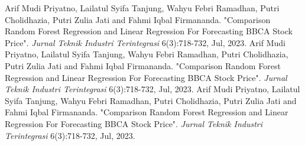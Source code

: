 \begin{thebibliography}{00}
% 
 Arif Mudi Priyatno, Lailatul Syifa Tanjung, Wahyu Febri Ramadhan, Putri Cholidhazia, Putri Zulia Jati and Fahmi Iqbal Firmananda. "Comparison Random Forest Regression and Linear Regression For Forecasting BBCA Stock Price". \textit{Jurnal Teknik Industri Terintegrasi} 6(3):718-732, Jul, 2023.
 Arif Mudi Priyatno, Lailatul Syifa Tanjung, Wahyu Febri Ramadhan, Putri Cholidhazia, Putri Zulia Jati and Fahmi Iqbal Firmananda. "Comparison Random Forest Regression and Linear Regression For Forecasting BBCA Stock Price". \textit{Jurnal Teknik Industri Terintegrasi} 6(3):718-732, Jul, 2023.
 Arif Mudi Priyatno, Lailatul Syifa Tanjung, Wahyu Febri Ramadhan, Putri Cholidhazia, Putri Zulia Jati and Fahmi Iqbal Firmananda. "Comparison Random Forest Regression and Linear Regression For Forecasting BBCA Stock Price". \textit{Jurnal Teknik Industri Terintegrasi} 6(3):718-732, Jul, 2023.

\end{thebibliography}

